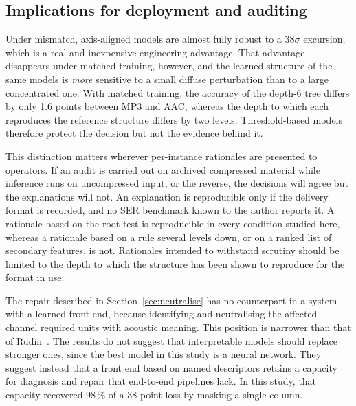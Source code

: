 \documentclass[lettersize,journal]{IEEEtran}
\begin{document}
\subsection{Implications for deployment and auditing}
Under mismatch, axis-aligned models are almost fully robust to a $38\sigma$
excursion, which is a real and inexpensive engineering advantage. That
advantage disappears under matched training, however, and the learned
structure of the same models is \emph{more} sensitive to a small diffuse
perturbation than to a large concentrated one. With matched training, the
accuracy of the depth-6 tree differs by only 1.6 points between MP3 and AAC,
whereas the depth to which each reproduces the reference structure differs by
two levels. Threshold-based models therefore protect the decision but not the
evidence behind it.

This distinction matters wherever per-instance rationales are presented to
operators. If an audit is carried out on archived compressed material while
inference runs on uncompressed input, or the reverse, the decisions will agree
but the explanations will not. An explanation is reproducible only if the
delivery format is recorded, and no SER benchmark known to the author reports
it. A rationale based on the root test is reproducible in every condition
studied here, whereas a rationale based on a rule several levels down, or on a
ranked list of secondary features, is not. Rationales intended to withstand
scrutiny should be limited to the depth to which the structure has been shown
to reproduce for the format in use.

The repair described in Section~\ref{sec:neutralise} has no counterpart in a
system with a learned front end, because identifying and neutralising the
affected channel required units with acoustic meaning. This position is
narrower than that of Rudin~\cite{rudin2019stop}. The results do not suggest
that interpretable models should replace stronger ones, since the best model in
this study is a neural network. They suggest instead that a front end based on
named descriptors retains a capacity for diagnosis and repair that end-to-end
pipelines lack. In this study, that capacity recovered 98\,\% of a 38-point loss
by masking a single column.
\end{document}
